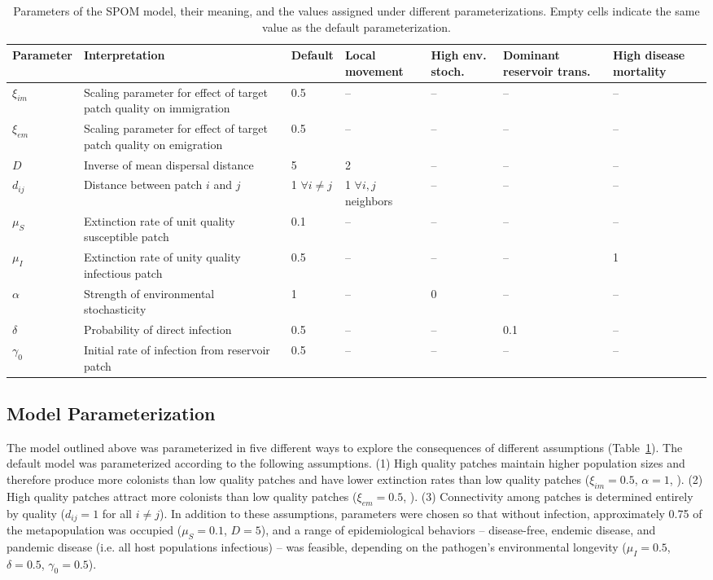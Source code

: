 \documentclass{svjour3}
\begin{document}
\begin{table}[h!]   
\caption{Parameters of the SPOM model, their meaning, and the values assigned under different parameterizations.  Empty cells indicate the same value as the default parameterization.}
\begin{tabular}{l p{5cm} p{1.5cm} p{1.5cm} p{1.5cm} p{1.5cm} p{1.5cm}}
Parameter & Interpretation &  Default & Local movement & High env. stoch. & Dominant reservoir trans. & High disease mortality \\
\hline
$\xi_{im}$ & Scaling parameter for effect of target patch quality on immigration & 0.5 & -- & -- & -- & --\\
$\xi_{em}$ & Scaling parameter for effect of target patch quality on emigration & 0.5 & -- & -- & --& --\\
$D$& Inverse of mean dispersal distance & 5 & 2 & -- & -- & --\\
$d_{ij}$ & Distance between patch $i$ and $j$ & 1 $\forall i \neq j$ & 1 $\forall i, j$ neighbors & -- & -- & --\\
\hline
$\mu_S$ & Extinction rate of unit quality susceptible patch & 0.1 & -- & -- & -- & --\\
$\mu_I$ & Extinction rate of unity quality infectious patch & 0.5 & -- & -- & -- & 1\\
$\alpha$ & Strength of environmental stochasticity & 1 & -- & 0 & -- & --\\
\hline
$\delta$ & Probability of direct infection & 0.5 & -- & -- & 0.1 & --\\
$\gamma_0$ & Initial rate of infection from reservoir patch & 0.5 & -- & -- & -- & --
\end{tabular}
\label{params}
\end{table}

\subsection{Model Parameterization}

The model outlined above was parameterized in five different ways to explore the consequences of different assumptions (Table~\ref{params}).  The default model was parameterized  according to the following assumptions. (1) High quality patches maintain higher population sizes and therefore produce more colonists than low quality patches and have lower extinction rates than low quality patches ($\xi_{im}=0.5$, $\alpha=1$, \cite{Hanski2003}).  (2) High quality patches attract more colonists than low quality patches ($\xi_{em}=0.5$, \cite{Hanski2003}).  (3)  Connectivity among patches is determined entirely by quality ($d_{ij}=1$ for all $i \neq j$).  In addition to these assumptions, parameters were chosen so that without infection, approximately 0.75 of the metapopulation was occupied ($\mu_S = 0.1$, $D=5$), and a range of epidemiological behaviors -- disease-free, endemic disease, and pandemic disease (i.e. all host populations infectious) -- was feasible, depending on the pathogen's environmental longevity ($\mu_I = 0.5$, $\delta = 0.5$, $\gamma_0 = 0.5$). 
\end{document}
